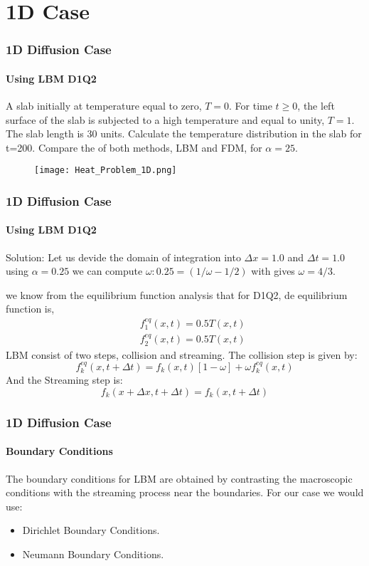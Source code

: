 \documentclass[12pt]{beamer}
\begin{document}
\section{1D Case}

\begin{frame}
  \frametitle{1D Diffusion Case}
  \framesubtitle{Using LBM D1Q2}
  A slab initially at temperature equal to zero, $T=0$. For time $t\ge0$, the left surface 
  of the slab is subjected to a high temperature and equal to unity, $T=1$. The slab length 
  is 30 units. Calculate the temperature distribution in the slab for t=200. Compare the 
  of both methods, LBM and FDM, for $\alpha=25$.
  \begin{figure}
    \centering
    \texttt{[image: Heat\_Problem\_1D.png]}
  \end{figure}
\end{frame}

\begin{frame}
  \frametitle{1D Diffusion Case}
  \framesubtitle{Using LBM D1Q2}
  Solution:
  Let us devide the domain of integration into $\Delta x = 1.0$ and $\Delta t= 1.0$
  using $\alpha = 0.25$ we can compute $\omega : 0.25 = (1/\omega-1/2)$ with gives 
  $\omega = 4/3$.
  
  we know from the equilibrium function analysis that for D1Q2, de equilibrium function
  is,
  \begin{eqnarray}
    && f_1^{eq}(x,t)=0.5T(x,t)\\
    && f_2^{eq}(x,t)=0.5T(x,t)
  \end{eqnarray}
  LBM consist of two steps, collision and streaming.
  The collision step is given by:
  \begin{equation} \nonumber
    f_k^{eq}(x,t+\Delta t)=f_k(x,t)[1-\omega]+\omega f_k^{eq}(x,t)
  \end{equation}
  And the Streaming step is:
  \begin{equation} \nonumber
    f_k(x+\Delta x,t+\Delta t)= f_k(x,t+\Delta t)
  \end{equation}
\end{frame}

\begin{frame}
  \frametitle{1D Diffusion Case}
  \framesubtitle{Boundary Conditions}
  The boundary conditions for LBM are obtained by contrasting the macroscopic 
  conditions with the streaming process near the boundaries. For our case we would use:
    \begin{itemize}
     \item Dirichlet Boundary Conditions.
     \item Neumann Boundary Conditions.
    \end{itemize}

\end{frame}
\end{document}
